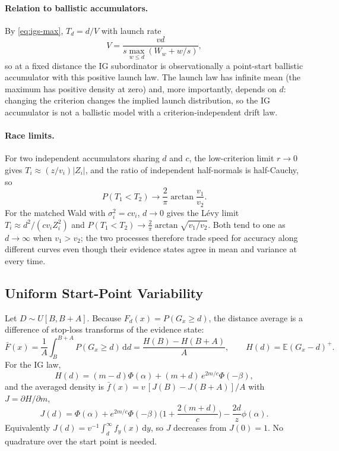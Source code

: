 \documentclass[12pt]{article}
\newcommand{\dd}{\,\mathrm{d}}
\newcommand{\PhiN}{\Phi}
\newcommand{\phiN}{\phi}
\begin{document}
\paragraph{Relation to ballistic accumulators.}
By \eqref{eq:igs-max}, $T_d=d/V$ with launch rate
\[
  V=\frac{vd}{s\max_{w\le d}(W_w+w/s)},
\]
so at a fixed distance the IG subordinator is observationally a point-start ballistic accumulator with this positive launch law. The launch law has infinite mean (the maximum has positive density at zero) and, more importantly, depends on $d$: changing the criterion changes the implied launch distribution, so the IG accumulator is not a ballistic model with a criterion-independent drift law.

\paragraph{Race limits.}
For two independent accumulators sharing $d$ and $c$, the low-criterion limit $r\to0$ gives $T_i\approx(z/v_i)|Z_i|$, and the ratio of independent half-normals is half-Cauchy, so
\begin{equation}
  P(T_1<T_2)\to\frac2\pi\arctan\frac{v_1}{v_2}.
\end{equation}
For the matched Wald with $\sigma_i^2=cv_i$, $d\to0$ gives the L\'evy limit $T_i\approx d^2/(cv_iZ_i^2)$ and $P(T_1<T_2)\to\frac2\pi\arctan\sqrt{v_1/v_2}$. Both tend to one as $d\to\infty$ when $v_1>v_2$; the two processes therefore trade speed for accuracy along different curves even though their evidence states agree in mean and variance at every time.

\subsection{Uniform Start-Point Variability}
Let $D\sim U[B,B+A]$. Because $F_d(x)=P(G_x\ge d)$, the distance average is a difference of stop-loss transforms of the evidence state:
\begin{equation}
  \bar F(x)=\frac1A\int_B^{B+A}P(G_x\ge d)\dd d=\frac{H(B)-H(B+A)}{A},\qquad
  H(d)=\mathbb E(G_x-d)^+ .
\end{equation}
For the IG law,
\begin{equation}
  H(d)=(m-d)\PhiN(\alpha)+(m+d)\,e^{2m/c}\PhiN(-\beta),
\end{equation}
and the averaged density is $\bar f(x)=v\,[J(B)-J(B+A)]/A$ with $J=\partial H/\partial m$,
\begin{equation}
  J(d)=\PhiN(\alpha)+e^{2m/c}\PhiN(-\beta)\Big(1+\frac{2(m+d)}c\Big)
  -\frac{2d}{z}\phiN(\alpha).
\end{equation}
Equivalently $J(d)=v^{-1}\int_d^\infty f_y(x)\dd y$, so $J$ decreases from $J(0)=1$. No quadrature over the start point is needed.
\end{document}
